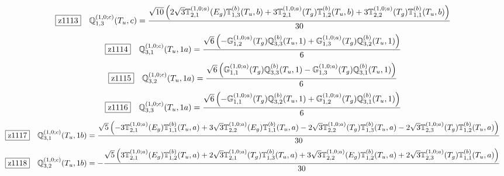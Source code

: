 \documentclass[fleqn,10pt,landscape]{jsarticle}
\begin{document}
\begin{dmath*}
\hspace*{3mm}\fbox{z1113}\quad \mathbb{Q}_{1,3}^{(1,0;c)}(T_{u},c)=\frac{\sqrt{10} \left(2 \sqrt{3} \mathbb{T}_{2,1}^{(1,0;a)}(E_{g}) \mathbb{T}_{1,3}^{(b)}(T_{u},b) + 3 \mathbb{T}_{2,1}^{(1,0;a)}(T_{g}) \mathbb{T}_{1,2}^{(b)}(T_{u},b) + 3 \mathbb{T}_{2,2}^{(1,0;a)}(T_{g}) \mathbb{T}_{1,1}^{(b)}(T_{u},b)\right)}{30}
\end{dmath*}
\begin{dmath*}
\hspace*{3mm}\fbox{z1114}\quad \mathbb{Q}_{3,1}^{(1,0;c)}(T_{u},1a)=\frac{\sqrt{6} \left(- \mathbb{G}_{1,2}^{(1,0;a)}(T_{g}) \mathbb{Q}_{3,3}^{(b)}(T_{u},1) + \mathbb{G}_{1,3}^{(1,0;a)}(T_{g}) \mathbb{Q}_{3,2}^{(b)}(T_{u},1)\right)}{6}
\end{dmath*}
\begin{dmath*}
\hspace*{3mm}\fbox{z1115}\quad \mathbb{Q}_{3,2}^{(1,0;c)}(T_{u},1a)=\frac{\sqrt{6} \left(\mathbb{G}_{1,1}^{(1,0;a)}(T_{g}) \mathbb{Q}_{3,3}^{(b)}(T_{u},1) - \mathbb{G}_{1,3}^{(1,0;a)}(T_{g}) \mathbb{Q}_{3,1}^{(b)}(T_{u},1)\right)}{6}
\end{dmath*}
\begin{dmath*}
\hspace*{3mm}\fbox{z1116}\quad \mathbb{Q}_{3,3}^{(1,0;c)}(T_{u},1a)=\frac{\sqrt{6} \left(- \mathbb{G}_{1,1}^{(1,0;a)}(T_{g}) \mathbb{Q}_{3,2}^{(b)}(T_{u},1) + \mathbb{G}_{1,2}^{(1,0;a)}(T_{g}) \mathbb{Q}_{3,1}^{(b)}(T_{u},1)\right)}{6}
\end{dmath*}
\begin{dmath*}
\hspace*{3mm}\fbox{z1117}\quad \mathbb{Q}_{3,1}^{(1,0;c)}(T_{u},1b)=\frac{\sqrt{5} \left(- 3 \mathbb{T}_{2,1}^{(1,0;a)}(E_{g}) \mathbb{T}_{1,1}^{(b)}(T_{u},a) + 3 \sqrt{3} \mathbb{T}_{2,2}^{(1,0;a)}(E_{g}) \mathbb{T}_{1,1}^{(b)}(T_{u},a) - 2 \sqrt{3} \mathbb{T}_{2,2}^{(1,0;a)}(T_{g}) \mathbb{T}_{1,3}^{(b)}(T_{u},a) - 2 \sqrt{3} \mathbb{T}_{2,3}^{(1,0;a)}(T_{g}) \mathbb{T}_{1,2}^{(b)}(T_{u},a)\right)}{30}
\end{dmath*}
\begin{dmath*}
\hspace*{3mm}\fbox{z1118}\quad \mathbb{Q}_{3,2}^{(1,0;c)}(T_{u},1b)=- \frac{\sqrt{5} \left(3 \mathbb{T}_{2,1}^{(1,0;a)}(E_{g}) \mathbb{T}_{1,2}^{(b)}(T_{u},a) + 2 \sqrt{3} \mathbb{T}_{2,1}^{(1,0;a)}(T_{g}) \mathbb{T}_{1,3}^{(b)}(T_{u},a) + 3 \sqrt{3} \mathbb{T}_{2,2}^{(1,0;a)}(E_{g}) \mathbb{T}_{1,2}^{(b)}(T_{u},a) + 2 \sqrt{3} \mathbb{T}_{2,3}^{(1,0;a)}(T_{g}) \mathbb{T}_{1,1}^{(b)}(T_{u},a)\right)}{30}
\end{dmath*}
\end{document}
